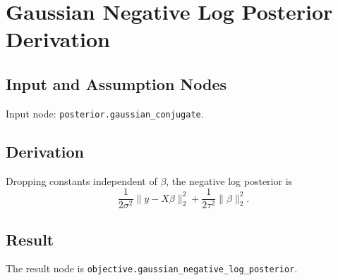 \section{Gaussian Negative Log Posterior Derivation}
\label{deriv:gaussian-negative-log-posterior}

\subsection{Input and Assumption Nodes}
Input node: \texttt{posterior.gaussian\_conjugate}.

\subsection{Derivation}
Dropping constants independent of \(\beta\), the negative log posterior is
\[
  \frac{1}{2\sigma^2}\|y-X\beta\|_2^2
  +
  \frac{1}{2\tau^2}\|\beta\|_2^2.
\]

\subsection{Result}
The result node is \texttt{objective.gaussian\_negative\_log\_posterior}.

